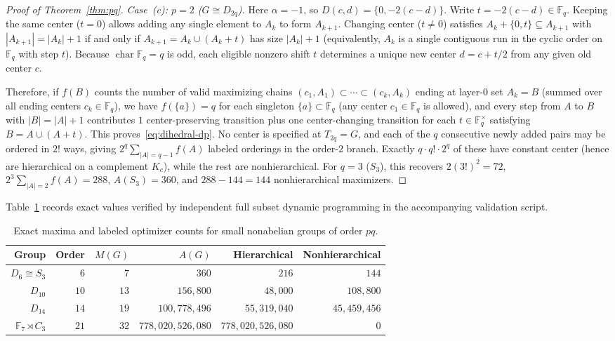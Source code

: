\documentclass[11pt,reqno]{amsart}
\numberwithin{equation}{section}
\theoremstyle{definition}
\theoremstyle{remark}
\newcommand{\F}{\mathbb{F}}
\begin{document}
\begin{proof}[Proof of Theorem~\ref{thm:pq}]
\smallskip
\noindent\emph{Case~(c): $p=2$ ($G\cong D_{2q}$).} Here $\alpha=-1$, so $D(c,d)=\{0,-2(c-d)\}$. Write $t=-2(c-d)\in\F_q$. Keeping the same center ($t=0$) allows adding any single element to $A_k$ to form $A_{k+1}$. Changing center ($t\neq 0$) satisfies $A_k + \{0,t\}\subseteq A_{k+1}$ with $|A_{k+1}|=|A_k|+1$ if and only if $A_{k+1}=A_k\cup (A_k+t)$ has size $|A_k|+1$ (equivalently, $A_k$ is a single contiguous run in the cyclic order on $\F_q$ with step $t$). Because $\operatorname{char}\F_q=q$ is odd, each eligible nonzero shift $t$ determines a unique new center $d = c + t/2$ from any given old center $c$.

Therefore, if $f(B)$ counts the number of valid maximizing chains $(c_1,A_1)\subset\cdots\subset (c_k,A_k)$ ending at layer-$0$ set $A_k=B$ (summed over all ending centers $c_k\in\F_q$), we have $f(\{a\})=q$ for each singleton $\{a\}\subset\F_q$ (any center $c_1\in\F_q$ is allowed), and every step from $A$ to $B$ with $|B|=|A|+1$ contributes $1$ center-preserving transition plus one center-changing transition for each $t\in\F_q^\times$ satisfying $B=A\cup(A+t)$. This proves~\eqref{eq:dihedral-dp}. No center is specified at $T_{2q}=G$, and each of the $q$ consecutive newly added pairs may be ordered in $2!$ ways, giving $2^q\sum_{|A|=q-1}f(A)$ labeled orderings in the order-$2$ branch. Exactly $q\cdot q!\cdot 2^q$ of these have constant center (hence are hierarchical on a complement $K_c$), while the rest are nonhierarchical. For $q=3$ ($S_3$), this recovers $2(3!)^2=72$, $2^3\sum_{|A|=2}f(A)=288$, $A(S_3)=360$, and $288-144=144$ nonhierarchical maximizers.
\end{proof}

Table~\ref{tab:pq-counts} records exact values verified by independent full subset dynamic programming in the accompanying validation script.

\begin{table}[ht]
\centering
\caption{Exact maxima and labeled optimizer counts for small nonabelian groups of order $pq$.}
\label{tab:pq-counts}
\begin{tabular}{rrrrrr}
\toprule
Group & Order & $M(G)$ & $A(G)$ & Hierarchical & Nonhierarchical \\
\midrule
$D_6 \cong S_3$ & $6$ & $7$ & $360$ & $216$ & $144$ \\
$D_{10}$ & $10$ & $13$ & $156{,}800$ & $48{,}000$ & $108{,}800$ \\
$D_{14}$ & $14$ & $19$ & $100{,}778{,}496$ & $55{,}319{,}040$ & $45{,}459{,}456$ \\
$\F_7\rtimes C_3$ & $21$ & $32$ & $778{,}020{,}526{,}080$ & $778{,}020{,}526{,}080$ & $0$ \\
\bottomrule
\end{tabular}
\end{table}
\end{document}

